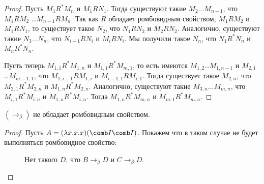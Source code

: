 \begin{proof}
    Пусть $M_1 R^{*} M_n$ и $M_1 R N_1$. Тогда существуют такие $M_2 \ldots M_{n-1}$, что $M_1 R M_2$ \ldots $M_{n-1} R M_n$.
	Так как $R$ обладает ромбовидным свойством, $M_1 R M_2$ и $M_1 R N_1$, то существует такое $N_2$,
	что $N_1 R N_2$ и $M_2 R N_2$. Аналогично, существуют такие $N_3 \ldots N_n$, что $N_{i-1} R N_{i}$ и $M_i R N_i$.
	Мы получили такое $N_n$, что $N_1 R^{*} N_n$ и $M_n R^{*} N_n$.
	
	Пусть теперь $M_{1,1}R^{*}M_{1,n}$ и $M_{1,1}R^{*}M_{m,1}$, то есть имеются $M_{1,2}$\ldots$M_{1,n-1}$ и $M_{2,1}$\ldots$M_{m-1,1}$,
	что $M_{1,i-1} R M_{1,i}$ и $M_{i-1, 1} R M_{i, 1}$.
	Тогда существует такое $M_{2,n}$, что $M_{2,1} R^{*} M_{2,n}$ и $M_{1,n} R^{*} M_{2,n}$.
	Аналогично, существуют такие $M_{3,n}\ldots M_{m,n}$, что $M_{i,1} R^{*} M_{i,n}$ и $M_{1,n} R^{*} M_{i,n}$.
	Тогда $M_{1,n} R^{*} M_{m,n}$ и $M_{m,1} R^{*} M_{m,n}$.
\end{proof}

\begin{lemma}
	$(\to_{\beta})$ не обладает ромбовидным свойством.
\end{lemma}

\begin{proof}
	Пусть $A=(\lambda{}x.x.x)(\comb I \comb I)$. Покажем что в таком случае не будет выполняться ромбовидное свойство:
	\
	\begin{figure}[ht]
		\centering
		\caption{Нет такого $D$, что $B \to_{\beta} D$ и $C \to_{\beta} D$.}
	\end{figure}	
\end{proof}



